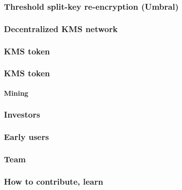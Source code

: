 \documentclass[xetex,mathsans,sans]{beamer}
\begin{document}
    \begin{frame}
        \frametitle{Threshold split-key re-encryption (Umbral)}
    \end{frame}

    \begin{frame}
        \frametitle{Decentralized KMS network}
    \end{frame}

    \begin{frame}
        \frametitle{KMS token}
    \end{frame}

    \begin{frame}
        \frametitle{KMS token}
        \framesubtitle{Mining}
    \end{frame}

    \begin{frame}
        \frametitle{Investors}
    \end{frame}

    \begin{frame}
        \frametitle{Early users}
    \end{frame}

    \begin{frame}
        \frametitle{Team}
    \end{frame}

    \begin{frame}
        \frametitle{How to contribute, learn}
    \end{frame}
\end{document}
